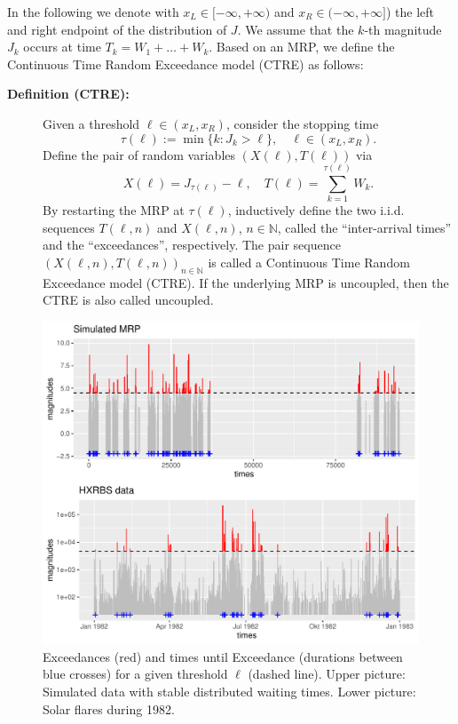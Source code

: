 \documentclass[]{elsarticle} %
\begin{document}
In the following we denote with \(x_L \in [-\infty, +\infty)\) and
\(x_R \in (-\infty, +\infty]\)) the left and right endpoint of the
distribution of \(J\). We assume that the \(k\)-th magnitude \(J_k\)
occurs at time \(T_k = W_1 + \ldots + W_k\). Based on an MRP, we define
the Continuous Time Random Exceedance model (CTRE) as follows:

\begin{description}
\item[\textbf{Definition (CTRE):}]
Given a threshold \(\ell \in (x_L, x_R)\), consider the stopping time
\[\tau(\ell) := \min\{k: J_k > \ell\},\quad \ell \in (x_L, x_R).\]
Define the pair of random variables \((X(\ell), T(\ell))\) via
\[X(\ell) = J_{\tau(\ell)} - \ell, \quad 
T(\ell) = \sum_{k=1}^{\tau(\ell)} W_k.\] By restarting the MRP at
\(\tau(\ell)\), inductively define the two i.i.d. sequences
\(T(\ell,n)\) and \(X(\ell, n)\), \(n \in \mathbb N\), called the
``inter-arrival times'' and the ``exceedances'', respectively. The pair
sequence \((X(\ell, n), T(\ell, n))_{n \in \mathbb N}\) is called a
Continuous Time Random Exceedance model (CTRE). If the underlying MRP is
uncoupled, then the CTRE is also called uncoupled.
\end{description}

\begin{figure}

{\centering \includegraphics[width=0.7\linewidth]{article_springer_files/figure-latex/thresholdedBursty-1} 

}

\caption{\label{fig:thresholdedBursty} Exceedances (red) and times until Exceedance (durations between blue crosses) for a given threshold $\ell$ (dashed line). Upper picture: Simulated data with stable distributed waiting times. Lower picture: Solar flares during 1982.}\label{fig:thresholdedBursty}
\end{figure}
\end{document}

